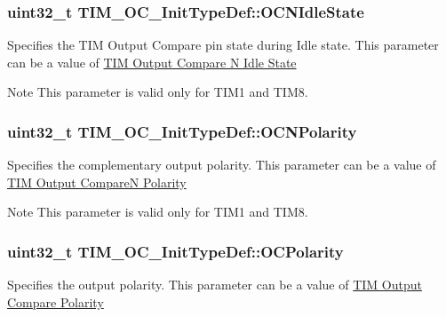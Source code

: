 \subsubsection[{\texorpdfstring{O\+C\+N\+Idle\+State}{OCNIdleState}}]{\setlength{\rightskip}{0pt plus 5cm}uint32\+\_\+t T\+I\+M\+\_\+\+O\+C\+\_\+\+Init\+Type\+Def\+::\+O\+C\+N\+Idle\+State}\hypertarget{struct_t_i_m___o_c___init_type_def_a0d70cc51990d7433fd76cc6ed1d06237}{}\label{struct_t_i_m___o_c___init_type_def_a0d70cc51990d7433fd76cc6ed1d06237}
Specifies the T\+IM Output Compare pin state during Idle state. This parameter can be a value of \hyperlink{group___t_i_m___output___compare___n___idle___state}{T\+IM Output Compare N Idle State} \begin{DoxyNote}{Note}
This parameter is valid only for T\+I\+M1 and T\+I\+M8. 
\end{DoxyNote}
\subsubsection[{\texorpdfstring{O\+C\+N\+Polarity}{OCNPolarity}}]{\setlength{\rightskip}{0pt plus 5cm}uint32\+\_\+t T\+I\+M\+\_\+\+O\+C\+\_\+\+Init\+Type\+Def\+::\+O\+C\+N\+Polarity}\hypertarget{struct_t_i_m___o_c___init_type_def_a21922d8e2fee659d081c4be4c500d1d4}{}\label{struct_t_i_m___o_c___init_type_def_a21922d8e2fee659d081c4be4c500d1d4}
Specifies the complementary output polarity. This parameter can be a value of \hyperlink{group___t_i_m___output___compare___n___polarity}{T\+IM Output CompareN Polarity} \begin{DoxyNote}{Note}
This parameter is valid only for T\+I\+M1 and T\+I\+M8. 
\end{DoxyNote}
\subsubsection[{\texorpdfstring{O\+C\+Polarity}{OCPolarity}}]{\setlength{\rightskip}{0pt plus 5cm}uint32\+\_\+t T\+I\+M\+\_\+\+O\+C\+\_\+\+Init\+Type\+Def\+::\+O\+C\+Polarity}\hypertarget{struct_t_i_m___o_c___init_type_def_a556b7137d041aceed3e45c87cbfb39cd}{}\label{struct_t_i_m___o_c___init_type_def_a556b7137d041aceed3e45c87cbfb39cd}
Specifies the output polarity. This parameter can be a value of \hyperlink{group___t_i_m___output___compare___polarity}{T\+IM Output Compare Polarity} 
